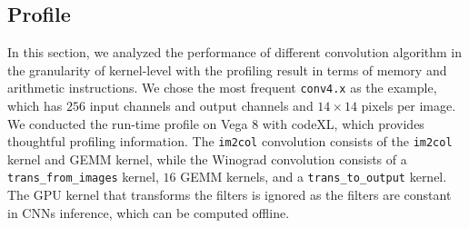 \documentclass{article}
\begin{document}













\subsection{Profile}


In this section, we analyzed the performance of different convolution algorithm in the granularity of kernel-level with the profiling result in terms of memory and arithmetic instructions. We chose the most frequent \texttt{conv4.x} as the example, which has $256$ input channels and output channels and $14 \times 14$ pixels per image. We conducted the run-time profile on Vega 8 with codeXL, which provides thoughtful profiling information. The \texttt{im2col} convolution consists of the \texttt{im2col} kernel and GEMM kernel, while the Winograd convolution consists of a \texttt{trans\_from\_images} kernel, $16$ GEMM kernels, and a \texttt{trans\_to\_output} kernel. The GPU kernel that transforms the filters is ignored as the filters are constant in CNNs inference, which can be computed offline.
\end{document}
